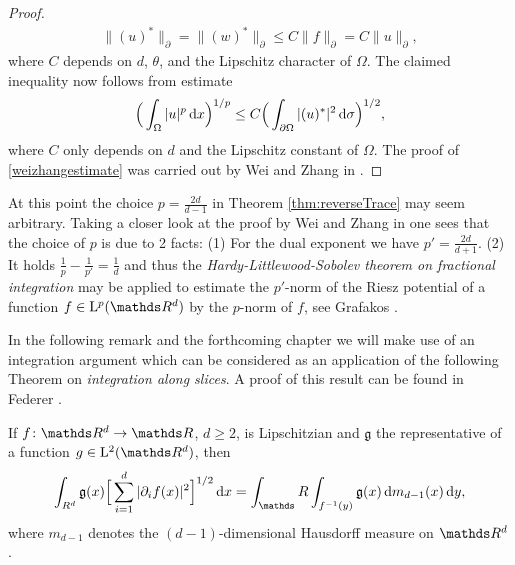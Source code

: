 \begin{proof}
\begin{align*}
    \| (u)^* \|_\partial = \| (w)^* \|_\partial \leq C \| f\|_\partial = C \|u\|_\partial,
  \end{align*}
  where $C$ depends on $d$, $\theta$, and the Lipschitz character of $\Omega$.
  The claimed inequality now follows from estimate
  \begin{align}
    \label{weizhangestimate}
    \Big( \int_\Omega |u|^p \, {\operatorname{d}\!{x}} \Big)^{1/p} \leq C \Big( \int_{\partial\Omega} |(u)^*|^2 \, {\operatorname{d}\!{\sigma}} \Big)^{1/2},
  \end{align}
  where $C$ only depends on $d$ and the Lipschitz constant of $\Omega$.
  The proof of \eqref{weizhangestimate} was carried out by Wei and Zhang in \cite[Lem. 3.3]{weiZhang}.
\end{proof}

\begin{rem}
  At this point the choice $p = \frac{2d}{d - 1}$ in Theorem \ref{thm:reverseTrace} may seem arbitrary.
  Taking a closer look at the proof by Wei and Zhang in \cite[Lem. 3.3]{weiZhang} one sees that the choice of $p$ is due to 2 facts: (1) For the dual exponent we have $p' = \frac{2d}{d + 1}$. (2) It holds $\frac{1}{p} - \frac{1}{p'} = \frac{1}{d}$ and thus the \emph{Hardy-Littlewood-Sobolev theorem on fractional integration} may be applied to estimate the $p'$-norm of the Riesz potential of a function $f \in \Ell^p(\R^d)$ by the $p$-norm of $f$, see Grafakos \cite[Thm 6.1.3]{grafakos2009modern}.
\end{rem}

In the following remark and the forthcoming chapter we will make use of an integration argument which can be considered as an application of the following Theorem on \emph{integration along slices}. A proof of this result can be found in Federer \cite[Thm. 3.2.12]{federer}.

\begin{thm}
  \label{thm:coarea}
  If $f \colon \R^d \to \R$, $d \geq 2$, is Lipschitzian and $\mathfrak{g}$ the representative of a function $g \in \Ell^2(\R^d)$, then
  \begin{align}
    \label{eq:coarea}
    \int_{R^d} \mathfrak{g}(x) \Big[ \sum_{i = 1}^d |\partial_i f(x)|^2 \Big]^{1/2} \d x = \int_\R \int_{f^{-1}(y)} \mathfrak{g}(x) \d m_{d - 1}(x) \d y,
  \end{align}
  where $m_{d - 1}$ denotes the $(d - 1)$-dimensional Hausdorff measure on $\R^d$.
\end{thm}

